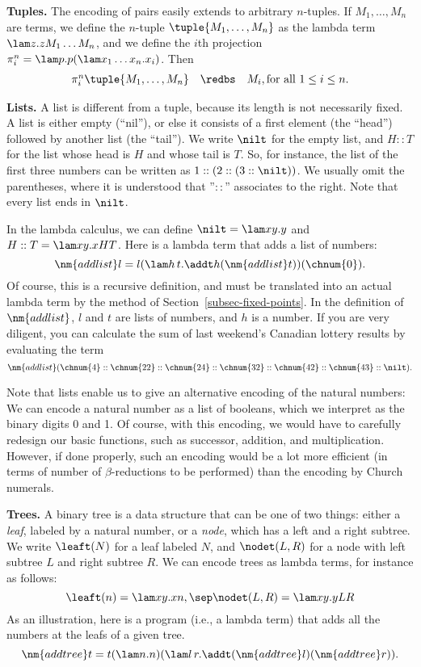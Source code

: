 \documentclass[12pt]{article}
\begin{document}
{\bf Tuples.} The encoding of pairs easily extends to arbitrary
$n$-tuples. If $M_1,\ldots,M_n$ are terms, we define the $n$-tuple
$\tuple{M_1,\ldots,M_n}$ as the lambda term $\lam z.zM_1\ldots M_n$,
and we define the $i$th projection $\pi^n_i=\lam p.p(\lam x_1\ldots
x_n.x_i)$. Then
\[ \begin{array}{rcl}
  \pi^n_i\tuple{M_1,\ldots,M_n} &\redbs& M_i, \mbox{for all $1\leq i\leq n$.}
\end{array}
\]

{\bf Lists.} A list is different from a tuple, because its length is
not necessarily fixed. A list is either empty (``nil''), or else it
consists of a first element (the ``head'') followed by another list
(the ``tail''). We write $\nilt$ for the empty list, and $H::T$ for
the list whose head is $H$ and whose tail is $T$. So, for instance,
the list of the first three numbers can be written as
$1::(2::(3::\nilt))$. We usually omit the parentheses, where it is
understood that ''$::$'' associates to the right. Note that every list
ends in $\nilt$.

In the lambda calculus, we can define $\nilt=\lam xy.y$ and $H::T =
\lam xy.xHT$. Here is a lambda term that adds a list of numbers:
\[ \nm{addlist} l = l(\lam h\,t.\addt h(\nm{addlist} t))(\chnum{0}).
\]
Of course, this is a recursive definition, and must be translated into
an actual lambda term by the method of Section~\ref{subsec-fixed-points}.
In the definition of $\nm{addlist}$, $l$ and $t$ are lists of numbers,
and $h$ is a number. If you are very diligent, you can calculate the sum of
last weekend's Canadian lottery results by evaluating the term
\[ \nm{addlist} (\chnum{4}::\chnum{22}::\chnum{24}::\chnum{32}::\chnum{42}::\chnum{43}::\nilt).
\]

Note that lists enable us to give an alternative encoding of the
natural numbers: We can encode a natural number as a list of booleans,
which we interpret as the binary digits 0 and 1. Of course, with this
encoding, we would have to carefully redesign our basic functions,
such as successor, addition, and multiplication. However, if done
properly, such an encoding would be a lot more efficient (in terms of
number of $\beta$-reductions to be performed) than the encoding by
Church numerals.

{\bf Trees.} A binary tree is a data structure that can be one of two
things: either a {\em leaf}, labeled by a natural number, or a {\em
  node}, which has a left and a right subtree. We write $\leaft(N)$ for
a leaf labeled $N$, and $\nodet(L,R)$ for a node with left subtree $L$
and right subtree $R$. We can encode trees as lambda terms, for
instance as follows:
\[ \leaft(n) = \lam xy.xn,\sep \nodet(L,R) = \lam xy.yLR \]
As an illustration, here is a program (i.e., a lambda term) that adds
all the numbers at the leafs of a given tree.
\[ \nm{addtree} t = t(\lam n.n)(\lam l\,
r.\addt(\nm{addtree}l)(\nm{addtree}r)).
\]
\end{document}

